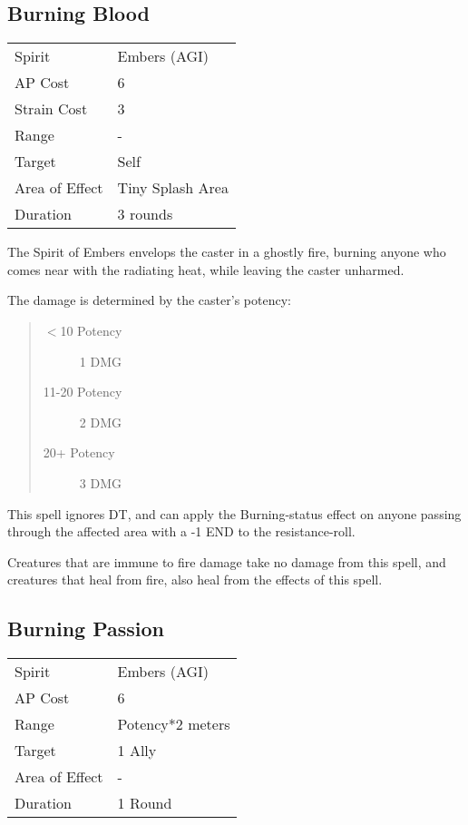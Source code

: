 \documentclass[11pt,a4paper,twocolumn]{book}
\begin{document}
\medskip

\subsection*{Burning Blood}
{
	\begin{tabu} to 75mm{| X[l,4] | X[l,7] |}
		\hline
		Spirit         & Embers (AGI)     \\
		AP Cost        & 6                \\
		Strain Cost    & 3                \\
		Range          & -                \\
		Target         & Self             \\
		Area of Effect & Tiny Splash Area \\
		Duration       & 3 rounds         \\ \hline
	\end{tabu}
	
}
\medskip
The Spirit of Embers envelops the caster in a ghostly fire, burning anyone who comes near with the radiating heat, while leaving the caster unharmed.

The damage is determined by the caster's potency:
\begin{quote}
	\begin{description}
		\item[$<$10 Potency]	1 DMG
		\item[11-20 Potency]	2 DMG
		\item[20+ Potency]		3 DMG
	\end{description}	
\end{quote}

This spell ignores DT, and can apply the Burning-status effect on anyone passing through the affected area with a -1 END to the resistance-roll.

Creatures that are immune to fire damage take no damage from this spell, and creatures that heal from fire, also heal from the effects of this spell.


\subsection*{Burning Passion}
{
	\begin{tabu} to 70mm{| X[l,4] | X[l,7] |}
		\hline
		Spirit         & Embers (AGI)          \\
		AP Cost        & 6                     \\
		Range          & Potency*2 meters \\
		Target         & 1 Ally                \\
		Area of Effect & -                     \\
		Duration       & 1 Round               \\ \hline
	\end{tabu}
	
}
\end{document}
